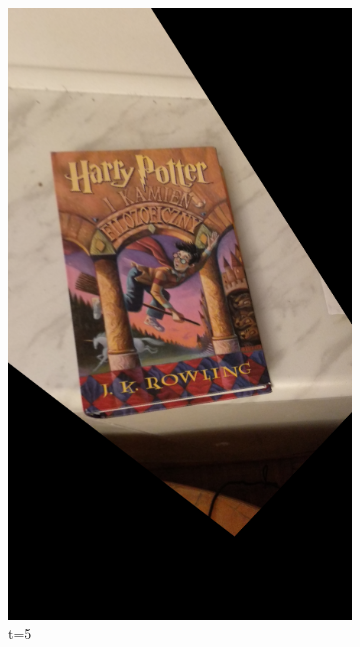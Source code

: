 \documentclass{article}
\begin{document}
\begin{figure}[H]
\begin{subfigure}[b]{0.3\linewidth}
			\includegraphics[width=\linewidth]{p5t.png}
			\caption{t=5}
		\end{subfigure}
		\begin{subfigure}[b]{0.3\linewidth}

\end{subfigure}
\end{figure}
\end{document}
